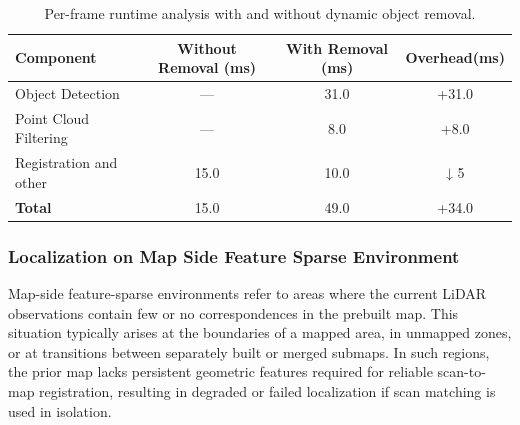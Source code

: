 \begin{table}[H]
	\centering
	\renewcommand{\arraystretch}{0.3}
	\setlength{\tabcolsep}{3pt}
	\caption{Per-frame runtime analysis with and without dynamic object removal.}
	\label{tab:dynamic_object_runtime_pipeline_comparison}
	\begin{tabular}{lccc}
		\toprule
		\textbf{Component} & \textbf{Without Removal (ms)} & \textbf{With Removal (ms)} & \textbf{Overhead(ms)} \\
		\midrule
		Object Detection         & —     & 31.0  & +31.0 \\
		Point Cloud Filtering    & —     & 8.0   & +8.0 \\
		Registration and other            & 15.0  & 10.0   & ↓ 5 \\
		\midrule
		\textbf{Total}           & 15.0  & 49.0  & +34.0 \\
		\bottomrule
	\end{tabular}
\end{table}



\subsubsection{Localization on Map Side Feature Sparse Environment}

Map-side feature-sparse environments refer to areas where the current LiDAR observations contain few or no correspondences in the prebuilt map. This situation typically arises at the boundaries of a mapped area, in unmapped zones, or at transitions between separately built or merged submaps. In such regions, the prior map lacks persistent geometric features required for reliable scan-to-map registration, resulting in degraded or failed localization if scan matching is used in isolation.

